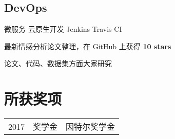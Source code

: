 \documentclass[]{deedy-resume-openfont}
\begin{document}
\begin{minipage}[t]{0.3\textwidth}
\subsection{DevOps}
微服务 \textbullet{} 云原生开发 \textbullet{} Jenkins \textbullet{} Travis CI

%
%

\end{minipage} 
\hfill
\begin{minipage}[t]{0.68\textwidth} 




\begin{tightemize}
    \item 最新情感分析论文整理，在 GitHub 上获得 \textbf{10 stars}
    \item 论文、代码、数据集方面大家研究
    \end{tightemize}
\sectionsep


% 
% 



\section{所获奖项} 
\begin{tabular}{rll}
2017         & 奖学金  & 因特尔奖学金 \\

\end{tabular}
\sectionsep




\end{minipage}
\end{document}

